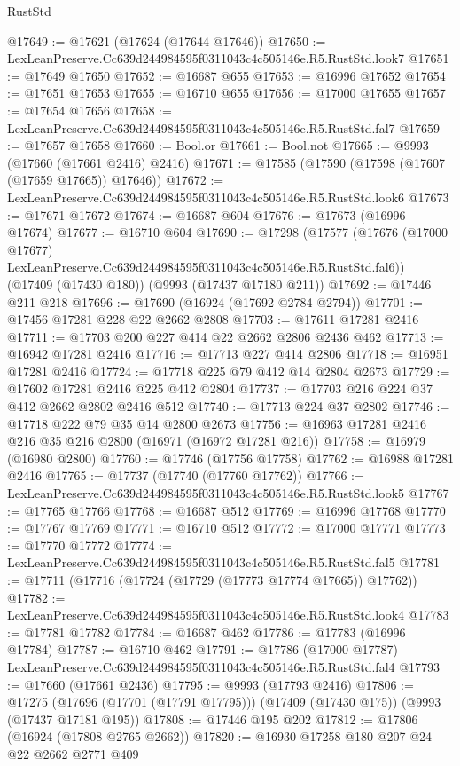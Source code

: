 \begin{lexlean}{RustStd}
\begin{coremodule}
@17649 := @17621 (@17624 (@17644 @17646))
@17650 := LexLeanPreserve.Cc639d244984595f0311043c4c505146e.R5.RustStd.look7
@17651 := @17649 @17650
@17652 := @16687 @655
@17653 := @16996 @17652
@17654 := @17651 @17653
@17655 := @16710 @655
@17656 := @17000 @17655
@17657 := @17654 @17656
@17658 := LexLeanPreserve.Cc639d244984595f0311043c4c505146e.R5.RustStd.fal7
@17659 := @17657 @17658
@17660 := Bool.or
@17661 := Bool.not
@17665 := @9993 (@17660 (@17661 @2416) @2416)
@17671 := @17585 (@17590 (@17598 (@17607 (@17659 @17665)) @17646))
@17672 := LexLeanPreserve.Cc639d244984595f0311043c4c505146e.R5.RustStd.look6
@17673 := @17671 @17672
@17674 := @16687 @604
@17676 := @17673 (@16996 @17674)
@17677 := @16710 @604
@17690 := @17298
    (@17577
      (@17676 (@17000 @17677) LexLeanPreserve.Cc639d244984595f0311043c4c505146e.R5.RustStd.fal6))
    (@17409 (@17430 @180))
    (@9993 (@17437 @17180 @211))
@17692 := @17446 @211 @218
@17696 := @17690 (@16924 (@17692 @2784 @2794))
@17701 := @17456 @17281 @228 @22 @2662 @2808
@17703 := @17611 @17281 @2416
@17711 := @17703 @200 @227 @414 @22 @2662 @2806 @2436 @462
@17713 := @16942 @17281 @2416
@17716 := @17713 @227 @414 @2806
@17718 := @16951 @17281 @2416
@17724 := @17718 @225 @79 @412 @14 @2804 @2673
@17729 := @17602 @17281 @2416 @225 @412 @2804
@17737 := @17703 @216 @224 @37 @412 @2662 @2802 @2416 @512
@17740 := @17713 @224 @37 @2802
@17746 := @17718 @222 @79 @35 @14 @2800 @2673
@17756 := @16963 @17281 @2416 @216 @35 @216 @2800 (@16971 (@16972 @17281 @216))
@17758 := @16979 (@16980 @2800)
@17760 := @17746 (@17756 @17758)
@17762 := @16988 @17281 @2416
@17765 := @17737 (@17740 (@17760 @17762))
@17766 := LexLeanPreserve.Cc639d244984595f0311043c4c505146e.R5.RustStd.look5
@17767 := @17765 @17766
@17768 := @16687 @512
@17769 := @16996 @17768
@17770 := @17767 @17769
@17771 := @16710 @512
@17772 := @17000 @17771
@17773 := @17770 @17772
@17774 := LexLeanPreserve.Cc639d244984595f0311043c4c505146e.R5.RustStd.fal5
@17781 := @17711 (@17716 (@17724 (@17729 (@17773 @17774 @17665)) @17762))
@17782 := LexLeanPreserve.Cc639d244984595f0311043c4c505146e.R5.RustStd.look4
@17783 := @17781 @17782
@17784 := @16687 @462
@17786 := @17783 (@16996 @17784)
@17787 := @16710 @462
@17791 := @17786 (@17000 @17787) LexLeanPreserve.Cc639d244984595f0311043c4c505146e.R5.RustStd.fal4
@17793 := @17660 (@17661 @2436)
@17795 := @9993 (@17793 @2416)
@17806 := @17275
    (@17696 (@17701 (@17791 @17795)))
    (@17409 (@17430 @175))
    (@9993 (@17437 @17181 @195))
@17808 := @17446 @195 @202
@17812 := @17806 (@16924 (@17808 @2765 @2662))
@17820 := @16930 @17258 @180 @207 @24 @22 @2662 @2771 @409

\end{coremodule}
\end{lexlean}
